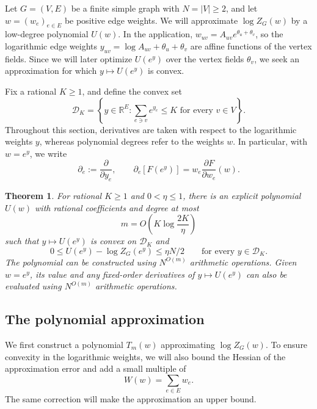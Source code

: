 \documentclass[11pt,reqno,letterpaper]{amsart}
\numberwithin{equation}{section}
\newtheorem{theorem}{Theorem}[section]
\theoremstyle{definition}
\theoremstyle{remark}
\newtheorem{remark}[remark]{Remark}
\newcommand{\R}{\mathbb R}
\newcommand{\cD}{\mathcal D}
\begin{document}
Let $G=(V,E)$ be a finite simple graph with $N=|V|\ge2$, and let
$w=(w_e)_{e\in E}$ be positive edge weights. We will approximate
$\log Z_G(w)$ by a low-degree polynomial $U(w)$. In the application,
$w_{uv}=A_{uv}e^{\theta_u+\theta_v}$, so the logarithmic edge weights
$y_{uv}=\log A_{uv}+\theta_u+\theta_v$ are affine functions of the
vertex fields. Since we will later optimize $U(e^y)$ over the vertex fields $\theta_v$, we seek an approximation for which
$y\mapsto U(e^y)$ is convex.

Fix a rational $K\ge1$, and define the convex set
\[
 \cD_K=\left\{y\in\R^E:
       \sum_{e\ni v}e^{y_e}\le K\text{ for every }v\in V\right\}.
\]
Throughout this section, derivatives
are taken with respect to the logarithmic weights $y$, whereas
polynomial degrees refer to the weights $w$. In particular, with
$w=e^y$, we write
\[
 \partial_e:=\frac{\partial}{\partial y_e},\qquad
 \partial_e[F(e^y)]=w_e\frac{\partial F}{\partial w_e}(w).
\]
\begin{theorem}\label{thm:surrogate}
For rational $K\ge1$ and $0<\eta\le1$, there is an explicit polynomial
$U(w)$ with rational coefficients and degree at most
\[
 m=O\!\left(K\log\frac{2K}{\eta}\right)
\]
such that $y\mapsto U(e^y)$ is convex on $\cD_K$ and
\[
 0\le U(e^y)-\log Z_G(e^y)\le\eta N/2
 \qquad\text{for every }y\in\cD_K.
\]
The polynomial can be constructed using $N^{O(m)}$ arithmetic
operations. Given $w=e^y$, its value and any fixed-order derivatives
of $y\mapsto U(e^y)$ can also be evaluated using $N^{O(m)}$
arithmetic operations. 
\end{theorem}


\subsection{The polynomial approximation}

We first construct a polynomial $T_m(w)$ approximating $\log Z_G(w)$.
To ensure convexity in the logarithmic weights, we will also bound
the Hessian of the approximation error and add a small multiple of
\[
 W(w)=\sum_{e\in E}w_e.
\]
The same correction will make the approximation an upper bound.
\end{document}
